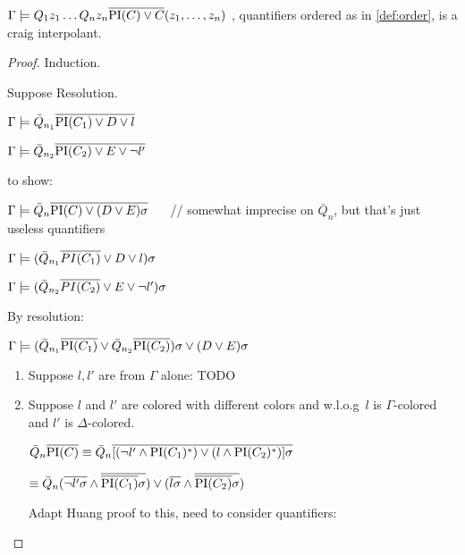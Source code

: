 \documentclass[,%
	paper=a4,%
	DIV14, 
	liststotoc,
	bibtotoc,
	draft=false,%
	numbers=noendperiod
]{scrartcl}
\begin{document}
\clearpage

\begin{prop}
	$\Gamma \entails Q_1 z_1 \ldots Q_n z_n \overline{\PI(C) \lor C}(z_1, \ldots, z_n)$ , quantifiers ordered as in \ref{def:order}, is a craig interpolant.
\end{prop}

\begin{proof}

	Induction.

	Suppose Resolution.
	\begin{prooftree}
	\end{prooftree}

	$\Gamma \entails \bar Q_{n_1} \overline{\PI(C_1)  \lor D \lor l}$

	$\Gamma \entails \bar Q_{n_2} \overline{\PI(C_2)  \lor E \lor \lnot l'}$

	to show:

	$\Gamma \entails \bar Q_n \overline {\PI(C) \lor (D \lor E)\sigma}$ $\quad$ // somewhat imprecise on $\bar Q_n$, but that's just useless quantifiers


	$\Gamma \entails ( \bar Q_{n_1} \overline{PI(C_1)}  \lor D \lor l )\sigma$

	$\Gamma \entails (\bar Q_{n_2} \overline{PI(C_2)}  \lor E \lor \lnot l')\sigma$

	By resolution:

	$\Gamma \entails (\bar Q_{n_1} \overline{\PI(C_1)}\lor \bar Q_{n_2} \overline{\PI(C_2)})\sigma  \lor (D \lor E )\sigma$


	\begin{enumerate}
		\item Suppose $l, l'$ are from $\Gamma$ alone:
			TODO


		\item Suppose $l$ and $l'$ are colored with different colors and w.l.o.g~$l$ is $\Gamma$-colored and $l'$ is $\Delta$-colored.

			$\bar Q_n \overline{\PI(C)} \equiv \bar Q_n  \overline{[ (\lnot l' \land \PI(C_1)^*) \lor (l \land \PI(C_2)^*) ] \sigma}$

			$\equiv \bar Q_n  (\overline{\lnot l'\sigma} \land \overline{\overline{\PI(C_1)}\sigma}) \lor (\overline{l\sigma} \land \overline{\overline{\PI(C_2)}\sigma})$

			Adapt Huang proof to this, need to consider quantifiers:


\end{enumerate}
\end{proof}
\end{document}
